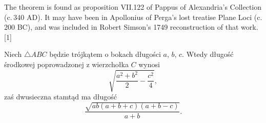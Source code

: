\begin{corollary}
	The theorem is found as proposition VII.122 of Pappus of Alexandria's Collection (c. 340 AD). It may have been in Apollonius of Perga's lost treatise Plane Loci (c. 200 BC), and was included in Robert Simson's 1749 reconstruction of that work.[1]
\end{corollary}

\begin{corollary}
	Niech $\triangle ABC$ będzie trójkątem o bokach długości $a$, $b$, $c$.
	Wtedy długość środkowej poprowadzonej z wierzchołka $C$ wynosi
	\begin{equation}
		\sqrt{\frac{a^2 + b^2}{2} - \frac{c^2}{4}},
	\end{equation}
	zaś dwusieczna stamtąd ma długość
	\begin{equation}
		\frac{\sqrt{ab (a+b+c)(a+b-c)}}{a+b}.
	\end{equation}
\end{corollary}